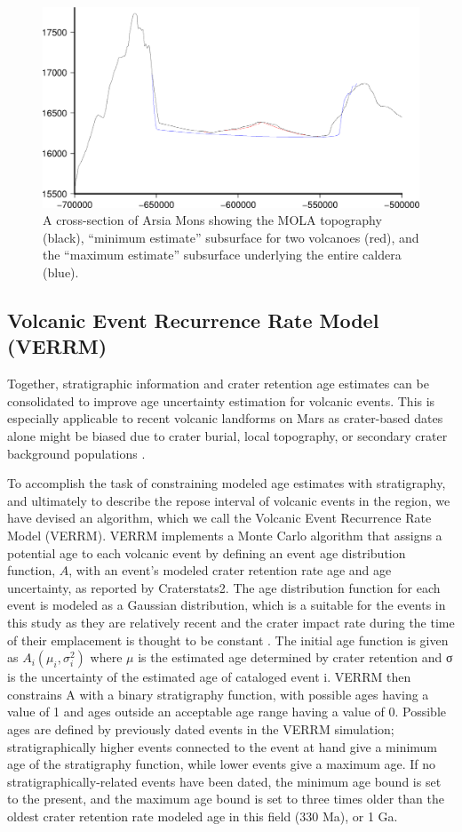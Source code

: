 \documentclass[12pt,letter]{article}
\begin{document}
\begin{figure}
\centering
\includegraphics[width=0.6\linewidth]{figures/vol_estimation_cross.png}
\caption{A cross-section of Arsia Mons showing the MOLA topography (black), ``minimum estimate'' subsurface for two volcanoes (red), and the ``maximum estimate'' subsurface underlying the entire caldera (blue).}
\label{fig_crosssection}
\end{figure}

\subsection{Volcanic Event Recurrence Rate Model (VERRM)}

Together, stratigraphic information and crater retention age estimates can be consolidated to improve age uncertainty estimation for volcanic events. This is especially applicable to recent volcanic landforms on Mars as crater-based dates alone might be biased due to crater burial, local topography, or secondary crater background populations \citep{robbins2011volcanic,platz2011eruption}.

To accomplish the task of constraining modeled age estimates with stratigraphy, and ultimately to describe the repose interval of volcanic events in the region, we have devised an algorithm, which we call the Volcanic Event Recurrence Rate Model (VERRM). VERRM implements a Monte Carlo algorithm that assigns a potential age to each volcanic event by defining an event age distribution function, $A$, with an event's modeled crater retention rate age and age uncertainty, as reported by Craterstats2. The age distribution function for each event is modeled as a Gaussian distribution, which is a suitable for the events in this study as they are relatively recent and the crater impact rate during the time of their emplacement is thought to be constant \citep{vaucher2009volcanic}. The initial age function is given as $A_i(\mu_i,\sigma_i^2)$ where $\mu$ is the estimated age determined by crater retention and σ is the uncertainty of the estimated age of cataloged event i. VERRM then constrains A with a binary stratigraphy function, with possible ages having a value of 1 and ages outside an acceptable age range having a value of 0. Possible ages are defined by previously dated events in the VERRM simulation; stratigraphically higher events connected to the event at hand give a minimum age of the stratigraphy function, while lower events give a maximum age. If no stratigraphically-related events have been dated, the minimum age bound is set to the present, and the maximum age bound is set to three times older than the oldest crater retention rate modeled age in this field (330 Ma), or 1 Ga.
\end{document}
